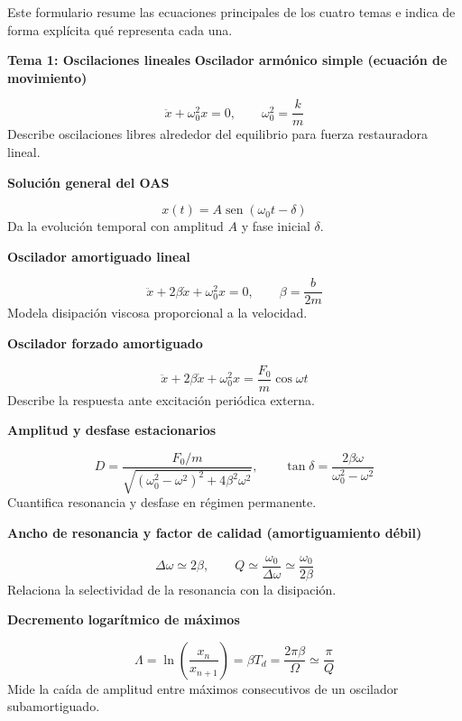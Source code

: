 \documentclass[12pt, a4paper]{article}
\theoremstyle{plain}
\theoremstyle{definition}
\theoremstyle{remark}
\DeclareMathOperator{\sen}{sen}
\newcommand{\formulaname}[1]{\textbf{#1}\par\vspace{2pt}}
\begin{document}
Este formulario resume las ecuaciones principales de los cuatro temas e indica
de forma explícita qué representa cada una.

\textbf{Tema 1: Oscilaciones lineales}
\formulaname{Oscilador armónico simple (ecuación de movimiento)}
\begin{equation}
  \ddot{x}+\omega_0^2x=0,\qquad \omega_0^2=\frac{k}{m}
\end{equation}
Describe oscilaciones libres alrededor del equilibrio para fuerza restauradora lineal.

\formulaname{Solución general del OAS}
\begin{equation}
  x(t)=A\sen(\omega_0 t-\delta)
\end{equation}
Da la evolución temporal con amplitud $A$ y fase inicial $\delta$.

\formulaname{Oscilador amortiguado lineal}
\begin{equation}
  \ddot{x}+2\beta\dot{x}+\omega_0^2x=0,\qquad \beta=\frac{b}{2m}
\end{equation}
Modela disipación viscosa proporcional a la velocidad.

\formulaname{Oscilador forzado amortiguado}
\begin{equation}
  \ddot{x}+2\beta\dot{x}+\omega_0^2x=\frac{F_0}{m}\cos\omega t
\end{equation}
Describe la respuesta ante excitación periódica externa.

\formulaname{Amplitud y desfase estacionarios}
\begin{equation}
  D=\frac{F_0/m}{\sqrt{(\omega_0^2-\omega^2)^2+4\beta^2\omega^2}},
  \qquad
  \tan\delta=\frac{2\beta\omega}{\omega_0^2-\omega^2}
\end{equation}
Cuantifica resonancia y desfase en régimen permanente.

\formulaname{Ancho de resonancia y factor de calidad (amortiguamiento débil)}
\begin{equation}
  \Delta\omega\simeq 2\beta,\qquad
  Q\simeq\frac{\omega_0}{\Delta\omega}\simeq\frac{\omega_0}{2\beta}
\end{equation}
Relaciona la selectividad de la resonancia con la disipación.

\formulaname{Decremento logarítmico de máximos}
\begin{equation}
  \Lambda=\ln\!\left(\frac{x_n}{x_{n+1}}\right)=\beta T_d
  =\frac{2\pi\beta}{\Omega}\simeq\frac{\pi}{Q}
\end{equation}
Mide la caída de amplitud entre máximos consecutivos de un oscilador subamortiguado.
\end{document}
